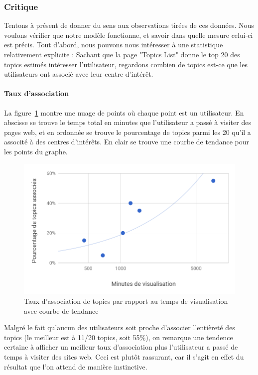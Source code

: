 \FloatBarrier

		\subsubsection{Critique}

			Tentons à présent de donner du sens aux observations tirées de ces données. Nous voulons vérifier que notre modèle fonctionne, et savoir dans quelle mesure celui-ci est précis. Tout d'abord, nous pouvons nous intéresser à une statistique relativement explicite : Sachant que la page "Topics List" donne le top 20 des topics estimés intéresser l'utilisateur, regardons combien de topics est-ce que les utilisateurs ont associé avec leur centre d'intérêt. 

			\paragraph{Taux d'association} La figure~\ref{chart-1} montre une nuage de points où chaque point est un utilisateur. En abscisse se trouve le temps total en minutes que l'utilisateur a passé à visiter des pages web, et en ordonnée se trouve le pourcentage de topics parmi les 20 qu'il a associté à des centres d'intérêts. En clair se trouve une courbe de tendance pour les points du graphe.

			\begin{figure}[!h]
				\centering
				\includegraphics[height=0.6\textwidth]{images/results/chart-1}
				\caption{Taux d'association de topics par rapport au temps de visualisation avec courbe de tendance}
				\label{chart-1}
			\end{figure}

			Malgré le fait qu'aucun des utilisateurs soit proche d'associer l'entièreté des topics (le meilleur est à 11/20 topics, soit 55\%), on remarque une tendence certaine à afficher un meilleur taux d'association plus l'utilisateur a passé de temps à visiter des sites web. Ceci est plutôt rassurant, car il s'agit en effet du résultat que l'on attend de manière instinctive.

